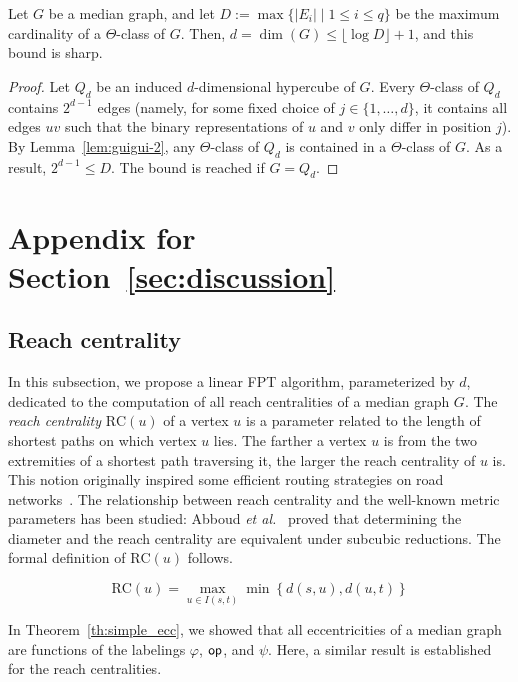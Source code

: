 \documentclass[a4paper,UKenglish,numberwithinsect,cleveref, autoref]{lipics-v2021}
\newcommand{\set}[1]{\left\{ #1 \right\}}
\newcommand{\opp}{\mbox{\textsf{op}}}
\newcommand{\rc}{\mbox{RC}}
\begin{document}
\begin{lemma}\label{lem:guigui-3}
Let $G$ be a median graph, and let $D := \max\{ |E_i| \mid 1 \leq i \leq q\}$ be the maximum cardinality of a $\Theta$-class of $G$. Then, $d = \dim(G) \leq \lfloor\log{D}\rfloor + 1$, and this bound is sharp.
\end{lemma}
\begin{proof}
Let $Q_d$ be an induced $d$-dimensional hypercube of $G$.
Every $\Theta$-class of $Q_d$ contains $2^{d-1}$ edges (namely, for some fixed choice of $j \in \{1,\ldots,d\}$, it contains all edges $uv$ such that the binary representations of $u$ and $v$ only differ in position $j$).
By Lemma~\ref{lem:guigui-2}, any $\Theta$-class of $Q_d$ is contained in a $\Theta$-class of $G$.
As a result, $2^{d-1} \leq D$.
The bound is reached if $G = Q_d$.
\end{proof}

\section{Appendix for Section~\ref{sec:discussion}} \label{asec:discussion}

\subsection{Reach centrality} \label{asubsec:reach_centrality}

In this subsection, we propose a linear FPT algorithm, parameterized by $d$, dedicated to the computation of all reach centralities of a median graph $G$. The \textit{reach centrality} $\rc(u)$ of a vertex $u$ is a parameter related to the length of shortest paths on which vertex $u$ lies. The farther a vertex $u$ is from the two extremities of a shortest path traversing it, the larger the reach centrality of $u$ is. This notion originally inspired some efficient routing strategies on road networks~\cite{Gu04}. The relationship between reach centrality and the well-known metric parameters has been studied: Abboud {\em et al.}~\cite{AbGrWi15} proved that determining the diameter and the reach centrality are equivalent under subcubic reductions. The formal definition of $\rc(u)$ follows.

\begin{equation}
\rc(u) = \max_{u \in I(s,t)} \min \set{d(s,u),d(u,t)}
\label{eq:reach_centrality}
\end{equation}

In Theorem~\ref{th:simple_ecc}, we showed that all eccentricities of a median graph are functions of the labelings $\varphi$, $\opp$, and $\psi$. Here, a similar result is established for the reach centralities.
\end{document}
